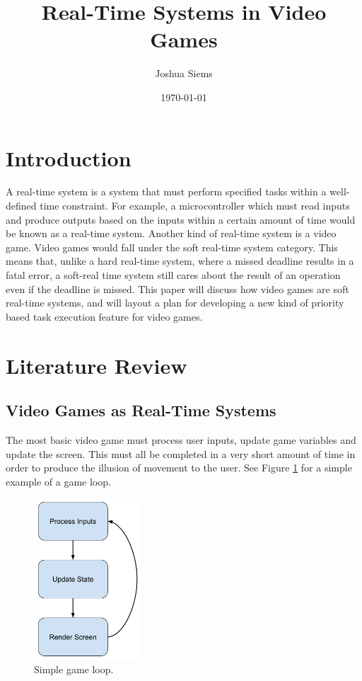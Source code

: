 \documentclass[a4paper, 12pt]{article}
\title{Real-Time Systems in Video Games}
\author{Joshua Siems}
\date{\today}
\begin{document}

\maketitle


\section{Introduction}
    A real-time system is a system that must perform specified tasks within a well-defined time constraint. For example, a microcontroller which must read inputs and produce outputs based on the inputs within a certain amount of time would be known as a real-time system. Another kind of real-time system is a video game. Video games would fall under the soft real-time system category. This means that, unlike a hard real-time system, where a missed deadline results in a fatal error, a soft-real time system still cares about the result of an operation even if the deadline is missed. This paper will discuss how video games are soft real-time systems, and will layout a plan for developing a new kind of priority based task execution feature for video games. 

\section{Literature Review}

    \subsection{Video Games as Real-Time Systems}
         The most basic video game must process user inputs, update game variables and update the screen. This must all be completed in a very short amount of time in order to produce the illusion of movement to the user. See Figure \ref{update_cycle} for a simple example of a game loop.
         \\

        \begin{figure}[H]
            \includegraphics[width=4cm]{game_loop_simple.png}
            \centering
            \caption{Simple game loop.}
            \label{update_cycle}
        \end{figure}
\end{document}
